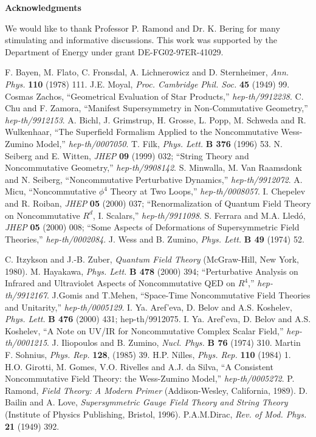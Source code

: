 \documentclass[a4paper,a4paper]{article}
\begin{document}
\vskip 1cm
\centerline{\bf Acknowledgments}
We would like to thank Professor P. Ramond and Dr. K. Bering for many stimulating and 
informative discussions. This work was supported by the Department of Energy 
under grant DE-FG02-97ER-41029.

\begin{thebibliography}{Ref}
 F. Bayen, M. Flato, C. Fronsdal, A. Lichnerowicz and D. Sternheimer, 
{\sl Ann. Phys.} {\bf 110} (1978) 111. 
 J.E. Moyal, {\sl Proc. Cambridge Phil. Soc.} {\bf 45} (1949) 99.
 Cosmas Zachos, ``Geometrical Evaluation of Star Products,'' 
{\it hep-th/9912238}.
 C. Chu and F. Zamora, ``Manifest Supersymmetry in Non-Commutative 
Geometry,'' {\it hep-th/9912153}.
 A. Bichl, J. Grimstrup, H. Grosse, L. Popp, M. Schweda and R. Wulkenhaar, 
``The Superfield Formalism Applied to the Noncommutative Wess-Zumino Model,'' 
{\it hep-th/0007050}.
 T. Filk, {\sl Phys. Lett.} {\bf B 376} (1996) 53.
 N. Seiberg and E. Witten, {\sl JHEP} {\bf 09} (1999) 032; 
``String Theory and Noncommutative Geometry,'' {\it hep-th/9908142}.
 S. Minwalla, M. Van Raamsdonk and N. Seiberg, 
``Noncommutative Perturbative Dynamics,'' {\it hep-th/9912072}.
 A. Micu, ``Noncommutative $\phi^4$ Theory at Two Loops,'' {\it hep-th/0008057}.
 I. Chepelev and R. Roiban, {\sl JHEP} {\bf 05} (2000) 037; 
``Renormalization of Quantum Field Theory on Noncommutative $R^d$, I. Scalars,'' 
{\it hep-th/9911098}.
 S. Ferrara and M.A. Lled\'{o}, {\sl JHEP} {\bf 05} (2000) 008; 
``Some Aspects of Deformations of Supersymmetric Field Theories,'' 
{\it hep-th/0002084}.
 J. Wess and B. Zumino, {\sl Phys. Lett.} {\bf B 49} (1974) 52.

 C. Itzykson and J.-B. Zuber, 
{\sl Quantum Field Theory} (McGraw-Hill, New York, 1980).
 M. Hayakawa, {\sl Phys. Lett.} {\bf B 478} (2000) 394; 
``Perturbative Analysis on Infrared and Ultraviolet Aspects of 
Noncommutative QED on $R^4$,'' {\it hep-th/9912167}.
 J.Gomis and T.Mehen, 
``Space-Time Noncommutative Field Theories and Unitarity,'' {\it hep-th/0005129}.
 I. Ya. Aref'eva, D. Belov and A.S. Koshelev, {\sl Phys. Lett.} 
{\bf B 476} (2000) 431; 
hep-th/9912075. 
 I. Ya. Aref'eva, D. Belov and A.S. Koshelev, 
``A Note on UV/IR for Noncommutative Complex Scalar Field,'' {\it hep-th/0001215}. 
J. Iliopoulos and B. Zumino, {\sl Nucl. Phys.} {\bf B 76} (1974) 310.
Martin F. Sohnius, {\sl Phys. Rep.} {\bf 128}, (1985) 39.
 H.P. Nilles, {\sl Phys. Rep.} {\bf 110} (1984) 1. 
 H.O. Girotti, M. Gomes, V.O. Rivelles and A.J. da Silva, 
``A Consistent Noncommutative Field Theory: the Wess-Zumino Model,'' 
{\it hep-th/0005272}.
 P. Ramond, {\sl Field Theory: A Modern Primer} 
(Addison-Wesley, California, 1989).
 D. Bailin and A. Love, 
{\sl Supersymmetric Gauge Field Theory and String Theory} 
(Institute of Physics Publishing, Bristol, 1996).
 P.A.M.Dirac, {\sl Rev. of Mod. Phys.} {\bf 21} (1949) 392.

\end{thebibliography}
\end{document}
